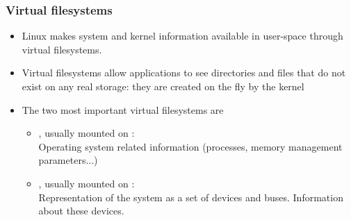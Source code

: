 \begin{frame}
  \frametitle{Virtual filesystems}
  \begin{itemize}
  \item Linux makes system and kernel information available in
    user-space through virtual filesystems.
  \item Virtual filesystems allow applications to see directories and
    files that do not exist on any real storage: they are created on the
    fly by the kernel
  \item The two most important virtual filesystems are
    \begin{itemize}
    \item {}, usually mounted on : \\
      Operating system related information (processes, memory
      management parameters...)
    \item {}, usually mounted on : \\
       Representation of the system as a set of
       devices and buses. Information about these devices.
    \end{itemize}
  \end{itemize}
\end{frame}
